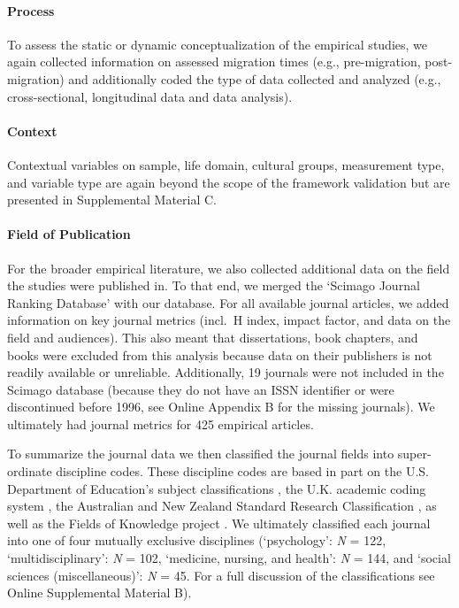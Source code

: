 \paragraph{Process}

To assess the static or dynamic conceptualization of the empirical
studies, we again collected information on assessed migration times
(e.g., pre-migration, post-migration) and additionally coded the type of
data collected and analyzed (e.g., cross-sectional, longitudinal data
and data analysis).

\paragraph{Context}

Contextual variables on sample, life domain, cultural groups,
measurement type, and variable type are again beyond the scope of the
framework validation but are presented in Supplemental Material C.

\paragraph{Field of Publication}

For the broader empirical literature, we also collected additional data
on the field the studies were published in. To that end, we merged the
`Scimago Journal Ranking Database' \citep{SCImago2020} with our
database. For all available journal articles, we added information on
key journal metrics (incl.~H index, impact factor, and data on the field
and audiences). This also meant that dissertations, book chapters, and
books were excluded from this analysis because data on their publishers
is not readily available or unreliable. Additionally, 19 journals were
not included in the Scimago database (because they do not have an ISSN
identifier or were discontinued before 1996, see Online Appendix B for
the missing journals). We ultimately had journal metrics for 425
empirical articles.

To summarize the journal data we then classified the journal fields into
super-ordinate discipline codes. These discipline codes are based in
part on the U.S. Department of Education's subject classifications
\citep[i.e., CIP,][]{InstituteofEducationSciences2020}, the U.K.
academic coding system
\citep[JACS 3.0,][]{HigherEducationStatisticsAgency2013}, the Australian
and New Zealand Standard Research Classification
\citep[ANZSRC 2020,][]{AustralianBureauofStatistics2020}, as well as the
Fields of Knowledge project \citep{ThingsmadeThinkable2014}. We
ultimately classified each journal into one of four mutually exclusive
disciplines (`psychology': \textit{N} = 122, `multidisciplinary':
\textit{N} = 102, `medicine, nursing, and health': \textit{N} = 144, and
`social sciences (miscellaneous)': \textit{N} = 45. For a full
discussion of the classifications see Online Supplemental Material B).

